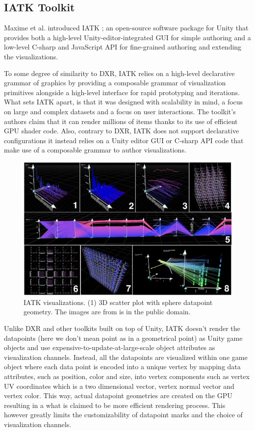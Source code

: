 \documentclass{vgtc}                          %
\begin{document}
\subsection{IATK Toolkit}
Maxime et al. introduced IATK \cite{iatk_toolkit}; an open-source software
package for Unity that provides both a high-level Unity-editor-integrated GUI
for simple authoring and a low-level C-sharp and JavaScript API for
fine-grained authoring and extending the visualizations.

To some degree of similarity to DXR, IATK relies on a high-level declarative
grammar of graphics by providing a composable grammar of visualization
primitives alongside a high-level interface for rapid prototyping and
iterations. What sets IATK apart, is that it was designed with scalability in
mind, a focus on large and complex datasets and a focus on user interactions.
The toolkit's authors claim that it can render millions of items thanks to its
use of efficient GPU shader code. Also, contrary to DXR, IATK does not support
declarative configurations it instead relies on a Unity editor GUI or C-sharp
API code that make use of a composable grammar to author visualizations.

\begin{figure}[tb]
	\centering
	\includegraphics[width=\columnwidth]{iatk}
	\caption{IATK visualizations. (1) 3D scatter plot with sphere datapoint
		geometry. The images are from is in the public domain.}
	\label{fig:sample}
\end{figure}

Unlike DXR and other toolkits built on top of Unity, IATK doesn't render
the datapoints (here we don't mean point as in a geometrical point) as Unity
game objects and use expensive-to-update-at-large-scale object attributes as
visualization channels. Instead, all the datapoints are visualized within one
game object where each data point is encoded into a unique vertex by mapping
data attributes, such as position, color and size, into vertex components such
as vertex UV coordinates which is a two dimensional vector, vertex normal vector
and vertex color. This way, actual datapoint geometries are created on the GPU
resulting in a what is claimed to be more efficient rendering process. This
however greatly limits the customizability of datapoint marks and the choice
of visualization channels.
\end{document}
